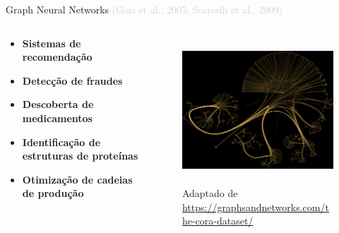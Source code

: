 \begin{frame}[c]{Graph Neural Networks {\small \textcolor{LightGray}{(Gori et al., 2005; Scarselli et al., 2009)}}}
    \begin{columns}[c]
        \begin{column}{0.46\linewidth}
            \begin{splusbox}{}
                \begin{itemize}
                    \justifying
                    \item \textbf{Sistemas de recomendação}
                    \item \textbf{Detecção de fraudes}
                    \item \textbf{Descoberta de medicamentos}
                    \item \textbf{Identificação de estruturas de proteínas}
                    \item \textbf{Otimização de cadeias de produção}
                \end{itemize}
            \end{splusbox}
        \end{column}
        \begin{column}{0.46\linewidth}
            \begin{figure}
                \centering
                \includegraphics[height=5.5cm]{images/planetoidcora.png}
                \caption{Adaptado de \url{https://graphsandnetworks.com/the-cora-dataset/}}
            \end{figure}
        \end{column}
    \end{columns}
\end{frame}

